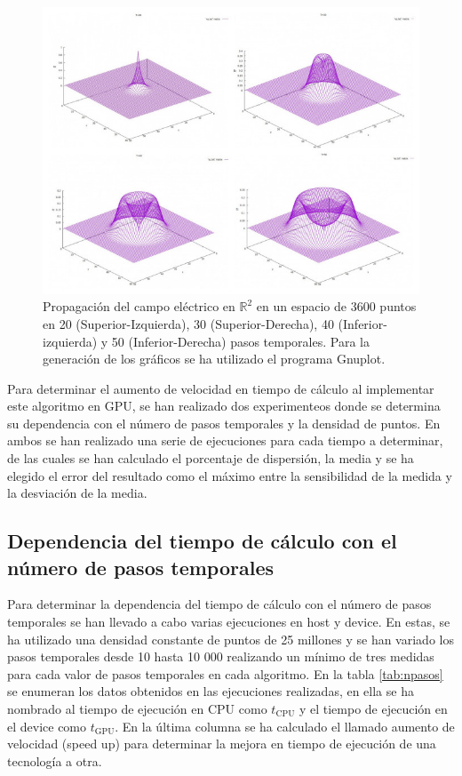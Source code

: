 \documentclass[11pt,a4paper,twoside,pdf]{article}
\numberwithin{equation}{section}
\begin{document}
\begin{figure}[ht]
\centering
\includegraphics[width=15 cm]{Solution.JPG}				
\caption{Propagación del campo eléctrico en $\mathbb R^{2}$ en un espacio de 3600 puntos en 20 (Superior-Izquierda), 30 (Superior-Derecha), 40 (Inferior-izquierda) y 50 (Inferior-Derecha) pasos temporales. Para la generación de los gráficos se ha utilizado el programa Gnuplot.}
\label{fig:solucion}
\end{figure}
\noindent

Para determinar el aumento de velocidad en tiempo de cálculo al implementar este algoritmo en GPU, se han realizado dos experimenteos donde se determina su dependencia con el número de pasos temporales y la densidad de puntos. En ambos se han realizado una serie de ejecuciones para cada tiempo a determinar, de las cuales se han calculado el porcentaje de dispersión, la media y se ha elegido el error del resultado como el máximo entre la sensibilidad de la medida y la desviación de la media.

\subsection{Dependencia del tiempo de cálculo con el número de pasos temporales} \label{Subsection:Variacion pasos temporales}

Para determinar la dependencia del tiempo de cálculo con el número de pasos temporales se han llevado a cabo varias ejecuciones en host y device. En estas, se ha utilizado una densidad constante de puntos de 25 millones y se han variado los pasos temporales desde 10 hasta 10 000 realizando un mínimo de tres medidas para cada valor de pasos temporales en cada algoritmo. En la tabla  \ref{tab:npasos} se enumeran los datos obtenidos en las ejecuciones realizadas, en ella se ha nombrado al tiempo de ejecución en CPU como $t_\text{CPU}$ y el tiempo de ejecución en el device como $t_\text{GPU}$. En la última columna se ha calculado el llamado aumento de velocidad (speed up) para determinar la mejora en tiempo de ejecución de una tecnología a otra.
\end{document}
